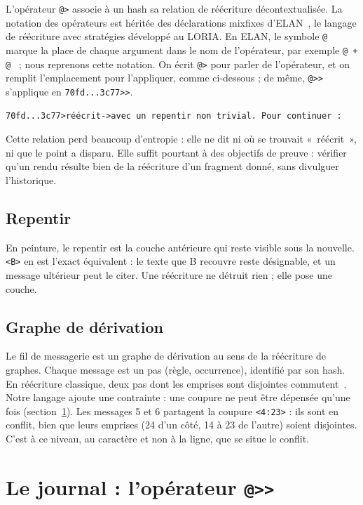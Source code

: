 \documentclass[11pt,a4paper]{article}
\newcommand{\cd}[1]{\texttt{#1}}
\begin{document}
L'opérateur \cd{@>} associe à un hash sa relation de réécriture décontextualisée. La notation des opérateurs est héritée des déclarations mixfixes d'ELAN~\cite{elan2002}, le langage de réécriture avec stratégies développé au LORIA. En ELAN, le symbole \cd{@} marque la place de chaque argument dans le nom de l'opérateur, par exemple \cd{@ + @}~\cite{elanmanual} ; nous reprenons cette notation. On écrit \cd{@>} pour parler de l'opérateur, et on remplit l'emplacement pour l'appliquer, comme ci-dessous ; de même, \cd{@>{}>} s'applique en \cd{70fd...3c77>{}>}.

\begin{Verbatim}
70fd...3c77>réécrit->avec un repentir non trivial. Pour continuer :
\end{Verbatim}

Cette relation perd beaucoup d'entropie : elle ne dit ni où se trouvait «~réécrit~», ni que le point a disparu. Elle suffit pourtant à des objectifs de preuve : vérifier qu'un rendu résulte bien de la réécriture d'un fragment donné, sans divulguer l'historique.

\subsection{Repentir}

En peinture, le repentir est la couche antérieure qui reste visible sous la nouvelle. \cd{<B>} en est l'exact équivalent : le texte que B recouvre reste désignable, et un message ultérieur peut le citer. Une réécriture ne détruit rien ; elle pose une couche.

\subsection{Graphe de dérivation}

Le fil de messagerie est un graphe de dérivation au sens de la réécriture de graphes. Chaque message est un pas (règle, occurrence), identifié par son hash. En réécriture classique, deux pas dont les emprises sont disjointes commutent~\cite{ehrig2006}. Notre langage ajoute une contrainte : une coupure ne peut être dépensée qu'une fois (section~\ref{sec:journal}). Les messages 5 et 6 partagent la coupure \cd{<4:23>} : ils sont en conflit, bien que leurs emprises (24 d'un côté, 14 à 23 de l'autre) soient disjointes. C'est à ce niveau, au caractère et non à la ligne, que se situe le conflit.

\section{Le journal : l'opérateur \texttt{@>{}>}}\label{sec:journal}
\end{document}
